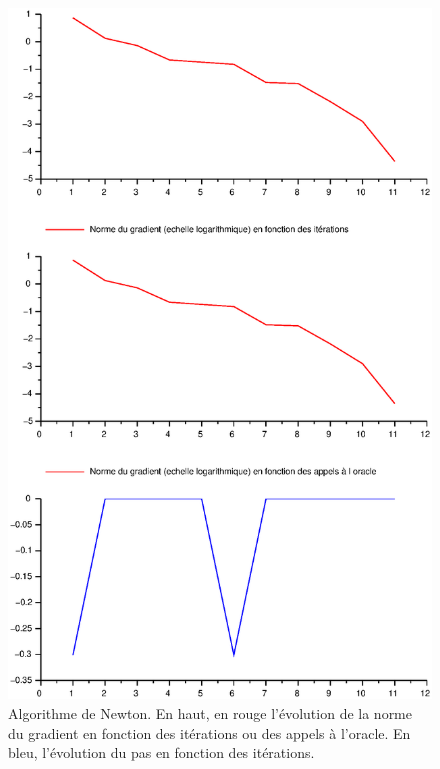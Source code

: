 \documentclass[11pt]{article}
\begin{document}
\begin{figure}[H]
  \centering
    \includegraphics[width=0.95 \textwidth]{Images/Lagrange_alg_Newt.eps}
  \caption{Algorithme de Newton. En haut, en rouge l'évolution de la norme du gradient en fonction des itérations ou des appels à l'oracle. En bleu, l'évolution du pas en fonction des itérations.}
\end{figure}
\end{document}
